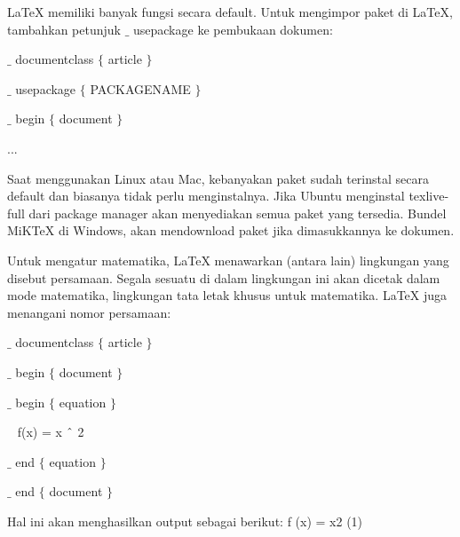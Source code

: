 LaTeX memiliki banyak fungsi secara default. Untuk mengimpor paket di LaTeX, tambahkan petunjuk  $ \_ $  usepackage ke pembukaan dokumen:\par

\noindent  $ \_ $ documentclass $ \{ $ article $ \} $ \par
\noindent 
\vspace{12pt}
\noindent  $ \_ $ usepackage $ \{ $ PACKAGENAME $ \} $ \par

\noindent 
\vspace{12pt}
\noindent  $ \_ $ begin $ \{ $ document $ \} $ \par

\noindent ...\par
\vspace{12pt}
Saat menggunakan Linux atau Mac, kebanyakan paket sudah terinstal secara default dan biasanya tidak perlu menginstalnya. Jika Ubuntu menginstal texlive-full dari package manager akan menyediakan semua paket yang tersedia. Bundel MiKTeX di Windows, akan mendownload paket jika dimasukkannya ke dokumen.\par

Untuk mengatur matematika, LaTeX menawarkan (antara lain) lingkungan yang disebut persamaan. Segala sesuatu di dalam lingkungan ini akan dicetak dalam mode matematika, lingkungan tata letak khusus untuk matematika. LaTeX juga menangani nomor persamaan:\par

{\fontsize{10pt}{10pt}\selectfont  $ \_ $ documentclass $ \{ $ article $ \} $ }\par

{\fontsize{10pt}{10pt}\selectfont  $ \_ $ begin $ \{ $ document $ \} $ }\par

{\fontsize{10pt}{10pt}\selectfont  $ \_ $ begin $ \{ $ equation $ \} $ }\par

{\fontsize{10pt}{10pt}\selectfont ~ f(x) = x $ \string^ $ 2}\par

{\fontsize{10pt}{10pt}\selectfont  $ \_ $ end $ \{ $ equation $ \} $ }\par

{\fontsize{10pt}{10pt}\selectfont  $ \_ $ end $ \{ $ document $ \} $ }\par


\noindent Hal ini akan menghasilkan output sebagai berikut: f (x) = x2 (1)\par

